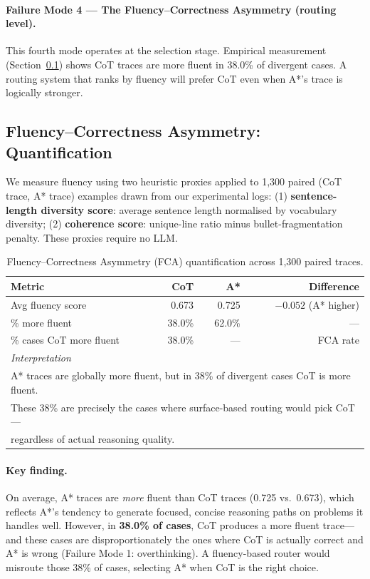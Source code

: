 \documentclass[11pt]{article}
\begin{document}
\paragraph{Failure Mode 4 — The Fluency--Correctness Asymmetry (routing level).}
This fourth mode operates at the selection stage. Empirical measurement (Section~\ref{sec:fluency}) shows CoT traces are more fluent in 38.0\% of divergent cases. A routing system that ranks by fluency will prefer CoT even when A*'s trace is logically stronger.

\subsection{Fluency--Correctness Asymmetry: Quantification}
\label{sec:fluency}

We measure fluency using two heuristic proxies applied to 1,300 paired (CoT trace, A* trace) examples drawn from our experimental logs: (1) \textbf{sentence-length diversity score}: average sentence length normalised by vocabulary diversity; (2) \textbf{coherence score}: unique-line ratio minus bullet-fragmentation penalty. These proxies require no LLM.

\begin{table}[t]
\centering
\caption{Fluency--Correctness Asymmetry (FCA) quantification across 1,300 paired traces.}
\label{tab:fluency}
\small
\begin{tabular}{lrrr}
\toprule
\textbf{Metric} & \textbf{CoT} & \textbf{A*} & \textbf{Difference} \\
\midrule
Avg fluency score          & 0.673 & 0.725 & $-0.052$ (A* higher) \\
\% more fluent             & 38.0\%  & 62.0\%  & --- \\
\% cases CoT more fluent   & 38.0\%  & ---   & FCA rate \\
\midrule
\multicolumn{4}{l}{\textit{Interpretation}} \\
\multicolumn{4}{l}{A* traces are globally more fluent, but in 38\% of divergent cases CoT is more fluent.} \\
\multicolumn{4}{l}{These 38\% are precisely the cases where surface-based routing would pick CoT—} \\
\multicolumn{4}{l}{regardless of actual reasoning quality.} \\
\bottomrule
\end{tabular}
\end{table}

\paragraph{Key finding.}
On average, A* traces are \emph{more} fluent than CoT traces (0.725 vs.\ 0.673), which reflects A*'s tendency to generate focused, concise reasoning paths on problems it handles well. However, in \textbf{38.0\% of cases}, CoT produces a more fluent trace—and these cases are disproportionately the ones where CoT is actually correct and A* is wrong (Failure Mode 1: overthinking). A fluency-based router would misroute those 38\% of cases, selecting A* when CoT is the right choice.
\end{document}
